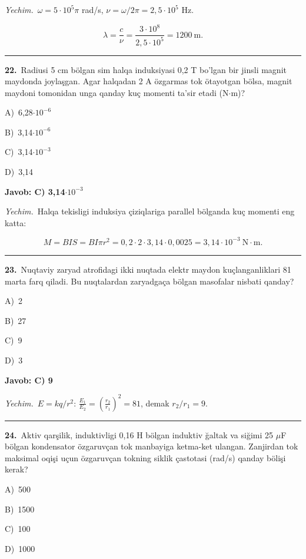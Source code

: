 \documentclass[11pt,a4paper]{article}
\newcommand{\opt}[2]{\hspace*{4mm}#1)\ #2\par}
\begin{document}
\noindent\textit{Yechim.}\ $\omega=5\cdot10^5\pi$ rad/s, $\nu=\omega/2\pi=2{,}5\cdot10^5$ Hz.\par
\[\lambda=\frac{c}{\nu}=\frac{3\cdot10^8}{2{,}5\cdot10^5}=1200\ \text{m}.\]\par\medskip\hrule\medskip
{}\noindent\begin{minipage}{\linewidth}
\textbf{22.}\ Radiusi 5 cm bölgan sim halqa induksiyasi 0,2 T bo’lgan bir jinsli magnit maydonda joylaşgan. Agar halqadan 2 A özgarmas tok ötayotgan bölsa, magnit maydoni tomonidan unga qanday kuç momenti ta’sir etadi (N$\cdot$m)?\par\smallskip
\opt{A}{6,28$\cdot10^{-6}$}
\opt{B}{3,14$\cdot10^{-6}$}
\opt{C}{3,14$\cdot10^{-3}$}
\opt{D}{3,14}
\end{minipage}\vspace{2pt}\par
\noindent\colorbox{gray!12}{\parbox{\dimexpr\linewidth-2\fboxsep}{\textbf{Javob: C) 3,14$\cdot10^{-3}$}}}\par\smallskip
\noindent\textit{Yechim.}\ Halqa tekisligi induksiya çiziqlariga parallel bölganda kuç momenti eng katta:\par
\[M=BIS=BI\pi r^2=0{,}2\cdot2\cdot3{,}14\cdot0{,}0025=3{,}14\cdot10^{-3}\ \text{N}\cdot\text{m}.\]\par\medskip\hrule\medskip
{}\noindent\begin{minipage}{\linewidth}
\textbf{23.}\ Nuqtaviy zaryad atrofidagi ikki nuqtada elektr maydon kuçlanganliklari 81 marta farq qiladi. Bu nuqtalardan zaryadgaça bölgan masofalar nisbati qanday?\par\smallskip
\opt{A}{2}
\opt{B}{27}
\opt{C}{9}
\opt{D}{3}
\end{minipage}\vspace{2pt}\par
\noindent\colorbox{gray!12}{\parbox{\dimexpr\linewidth-2\fboxsep}{\textbf{Javob: C) 9}}}\par\smallskip
\noindent\textit{Yechim.}\ $E=kq/r^2$: $\frac{E_1}{E_2}=\left(\frac{r_2}{r_1}\right)^2=81$, demak $r_2/r_1=9$.\par\par\medskip\hrule\medskip
{}\noindent\begin{minipage}{\linewidth}
\textbf{24.}\ Aktiv qarşilik, induktivligi 0,16 H bölgan induktiv ğaltak va siğimi 25 $\mu$F bölgan kondensator özgaruvçan tok manbayiga ketma-ket ulangan. Zanjirdan tok maksimal oqişi uçun özgaruvçan tokning siklik çastotasi (rad/s) qanday bölişi kerak?\par\smallskip
\opt{A}{500}
\opt{B}{1500}
\opt{C}{100}
\opt{D}{1000}
\end{minipage}\vspace{2pt}\par
\end{document}
